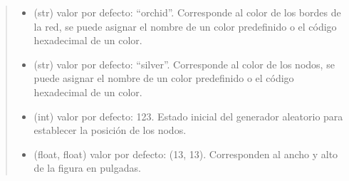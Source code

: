 \documentclass[letterpaper,10pt,openany,spanish]{sphinxmanual}
\begin{document}
\begin{fulllineitems}
\begin{quote}
\begin{description}
\begin{itemize}
\item {} 
 \textendash{} (str) valor por defecto: “orchid”. Corresponde al color de los bordes de la red, se puede asignar el nombre de un color predefinido o el código hexadecimal de un color.

\item {} 
 \textendash{} (str) valor por defecto: “silver”. Corresponde al color de los nodos, se puede asignar el nombre de un color predefinido o el código hexadecimal de un color.

\item {} 
 \textendash{} (int) valor por defecto: 123. Estado inicial del generador aleatorio para establecer la posición de los nodos.

\item {} 
 \textendash{} (float, float) valor por defecto: (13, 13). Corresponden al ancho y alto de la figura en pulgadas.

\end{itemize}

\end{description}\end{quote}

\end{fulllineitems}

\end{document}
